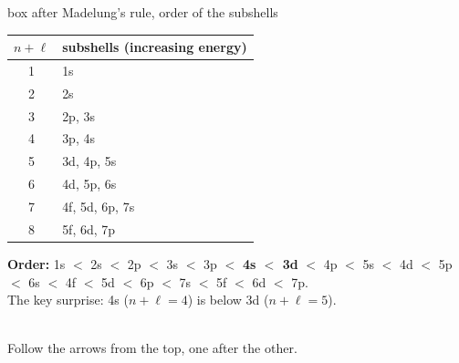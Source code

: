\begin{handout}{box after Madelung's rule, order of the subshells}
\begin{minipage}{0.52\linewidth}\small
\begin{center}
\begin{tabular}{@{}c l@{}}
\toprule
$n + \ell$ & subshells (increasing energy)\\ \midrule
1 & 1s\\ 2 & 2s\\ 3 & 2p, 3s\\ 4 & 3p, 4s\\ 5 & 3d, 4p, 5s\\ 6 & 4d, 5p, 6s\\
7 & 4f, 5d, 6p, 7s\\ 8 & 5f, 6d, 7p\\ \bottomrule
\end{tabular}
\end{center}
\textbf{Order:} 1s $<$ 2s $<$ 2p $<$ 3s $<$ 3p $<$ \textbf{4s $<$ 3d} $<$ 4p $<$ 5s $<$ 4d $<$ 5p $<$ 6s
$<$ 4f $<$ 5d $<$ 6p $<$ 7s $<$ 5f $<$ 6d $<$ 7p.\\[2pt]
The key surprise: 4s ($n+\ell = 4$) is below 3d ($n+\ell = 5$).
\end{minipage}\hfill
\begin{minipage}{0.44\linewidth}\centering
{}\\[-2pt]
{\scriptsize Follow the arrows from the top, one after the other.}
\end{minipage}
\end{handout}

